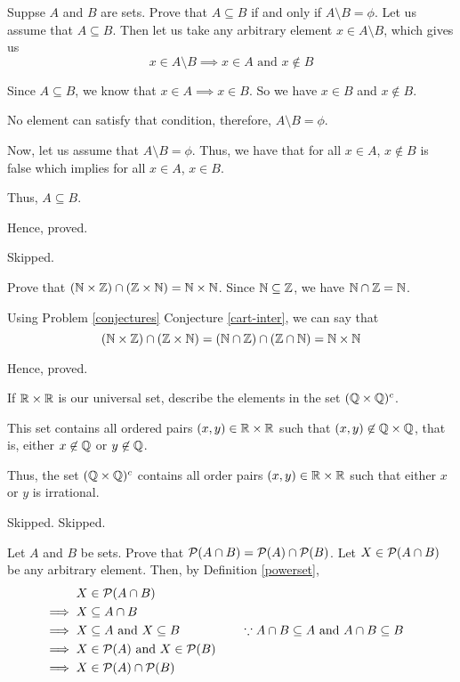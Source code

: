\bp Suppse $A$ and $B$ are sets. Prove that $A \subseteq B$ if and only if $A \setminus B = \phi$. \ep
\bs
	Let us assume that $A \subseteq B$. Then let us take any arbitrary element $x \in A \setminus B$, which gives us
		$$x \in A \setminus B \implies x \in A \text{ and } x \not\in B$$
		
	Since $A \subseteq B$, we know that $x \in A \implies x \in B$. So we have $x \in B$ and $x \not\in B$.

	No element can satisfy that condition, therefore, $A \setminus B = \phi$.

	Now, let us assume that $A \setminus B = \phi$. Thus, we have that for all $x \in A$, $x \not\in B$ is false which implies for all $x \in A$, $x \in B$.

	Thus, $A \subseteq B$.

	Hence, proved.
\es

\bp Skipped. \ep

\bp Prove that $(\mathbb{N} \times \mathbb{Z}) \cap (\mathbb{Z} \times \mathbb{N}) = \mathbb{N} \times \mathbb{N}$. \ep
\bs
Since $\mathbb{N} \subseteq \mathbb{Z}$, we have $\mathbb{N} \cap \mathbb{Z} = \mathbb{N}$.

Using Problem \ref{conjectures} Conjecture \ref{cart-inter}, we can say that 
	$$(\mathbb{N} \times \mathbb{Z}) \cap (\mathbb{Z} \times \mathbb{N}) 
		= (\mathbb{N} \cap \mathbb{Z}) \cap (\mathbb{Z} \cap \mathbb{N})
		= \mathbb{N} \times \mathbb{N}$$

Hence, proved.
\es

\bp If $\mathbb{R} \times \mathbb{R}$ is our universal set, describe the elements in the set $( \mathbb{Q} \times \mathbb{Q})^c$. \ep

\bs This set contains all ordered pairs $(x, y) \in \mathbb{R} \times \mathbb{R}$ such that $(x, y) \not\in \mathbb{Q} \times \mathbb{Q}$, that is, either $x \not\in \mathbb{Q}$ or $y \not\in \mathbb{Q}$.

Thus, the set $(\mathbb{Q} \times \mathbb{Q})^c$ contains all order pairs $(x,y) \in \mathbb{R}\times\mathbb{R}$ such that either $x$ or $y$ is irrational.
\es

\bp Skipped. \ep
\bp Skipped. \ep

\bp Let $A$ and $B$ be sets. Prove that $\mathcal{P}(A \cap B) = \mathcal{P}(A) \cap \mathcal{P}(B)$. \ep
\bs
Let $X \in \mathcal{P}(A \cap B)$ be any arbitrary element. Then, by Definition \ref{powerset},
	\begin{align*}
		X &\in \mathcal{P}(A \cap B) \\
		\implies X &\subseteq A \cap B \\
		\implies X &\subseteq A \text{ and } X \subseteq B 
							 && \quad \because A \cap B \subseteq A \text{ and } A \cap B \subseteq B \\
		\implies X &\in \mathcal{P}(A) \text{ and } X \in \mathcal{P}(B) \\
		\implies X &\in \mathcal{P}(A) \cap \mathcal{P}(B)
	\end{align*}

